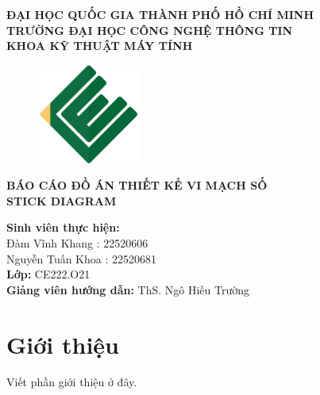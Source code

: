 \documentclass[a4paper,12pt]{article}
\begin{document}
\thispagestyle{empty} %
\begin{center}
\textbf{ĐẠI HỌC QUỐC GIA THÀNH PHỐ HỒ CHÍ MINH}\\
\textbf{TRƯỜNG ĐẠI HỌC CÔNG NGHỆ THÔNG TIN}\\
\textbf{KHOA KỸ THUẬT MÁY TÍNH}\\[1cm]

\begin{figure}[H]
    \centering
    \includegraphics[width=0.3\textwidth]{../PNG/CE.png}
    \label{fig:LOGO_CE}\\
\end{figure}

\textbf{\Large BÁO CÁO ĐỒ ÁN THIẾT KẾ VI MẠCH SỐ}\\
\textbf{\Large STICK DIAGRAM}\\[2cm]

\begin{flushleft}
\textbf{Sinh viên thực hiện:} \\
Đàm Vĩnh Khang : 22520606 \\
Nguyễn Tuấn Khoa : 22520681\\[0.5cm]

\textbf{Lớp:} CE222.O21\\
\textbf{Giảng viên hướng dẫn:} ThS. Ngô Hiếu Trường\\[1cm]

\end{flushleft}
\end{center}

\newpage

\tableofcontents
\newpage


\section{Giới thiệu}
Viết phần giới thiệu ở đây.
\end{document}
